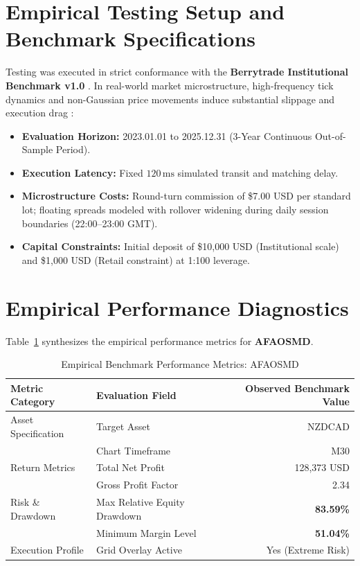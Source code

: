 \documentclass[11pt,a4paper]{article}
\begin{document}
\section{Empirical Testing Setup and Benchmark Specifications}
Testing was executed in strict conformance with the \textbf{Berrytrade Institutional Benchmark v1.0} \cite{artsu2026illusion}. In real-world market microstructure, high-frequency tick dynamics and non-Gaussian price movements induce substantial slippage and execution drag \cite{kyle1985continuous, amihud2002illiquidity, cont2001empirical, mandelbrot1963variation}:
\begin{itemize}
    \item \textbf{Evaluation Horizon:} 2023.01.01 to 2025.12.31 (3-Year Continuous Out-of-Sample Period).
    \item \textbf{Execution Latency:} Fixed $120\,\text{ms}$ simulated transit and matching delay.
    \item \textbf{Microstructure Costs:} Round-turn commission of \$7.00 USD per standard lot; floating spreads modeled with rollover widening during daily session boundaries (22:00--23:00 GMT).
    \item \textbf{Capital Constraints:} Initial deposit of \$10,000 USD (Institutional scale) and \$1,000 USD (Retail constraint) at 1:100 leverage.
\end{itemize}

\section{Empirical Performance Diagnostics}
Table~\ref{tab:metrics} synthesizes the empirical performance metrics for \textbf{AFAOSMD}.

\begin{table}[H]
\centering
\caption{Empirical Benchmark Performance Metrics: AFAOSMD}
\label{tab:metrics}
\begin{tabular}{llr}
\toprule
\textbf{Metric Category} & \textbf{Evaluation Field} & \textbf{Observed Benchmark Value} \\
\midrule
Asset Specification & Target Asset & NZDCAD \\
& Chart Timeframe & M30 \\
Return Metrics & Total Net Profit & 128,373 USD \\
& Gross Profit Factor & 2.34 \\
Risk \& Drawdown & Max Relative Equity Drawdown & \textbf{83.59\%} \\
& Minimum Margin Level & \textbf{51.04\%} \\
Execution Profile & Grid Overlay Active & Yes (Extreme Risk) \\
\bottomrule
\end{tabular}
\end{table}
\end{document}
